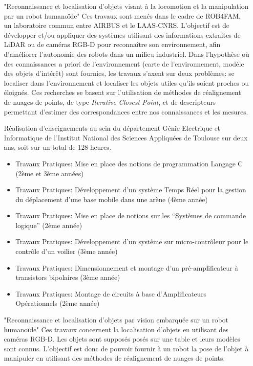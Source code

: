 \documentclass[11pt,a4paper,sans]{moderncv}         %
\begin{document}
{"Reconnaissance et localisation d'objets visant \`a la locomotion et la manipulation par un robot humano\"ide"}
{Ces travaux sont men\'es dans le cadre de ROB4FAM, un laboratoire commun entre AIRBUS et le LAAS-CNRS.
L'objectif est de d\'evelopper et/ou appliquer des syst\`emes utilisant des informations extraites de LiDAR ou de cam\'eras RGB-D pour reconna\^itre son environnement, afin d'am\'eliorer l'autonomie des robots dans un milieu industriel.
Dans l'hypoth\`ese o\`u des connaissances a priori de l'environnement (carte de l'environnement, mod\`ele des objets d'int\'er\^et) sont fournies, les travaux s'axent sur deux probl\`emes: se localiser dans l'environnement et localiser les objets utiles qu'ils soient proches ou \'eloign\'es.
Ces recherches se basent sur l'utilisation de m\'ethodes de r\'ealignement de nuages de points, de type \emph{Iterative Closest Point}, et de descripteurs permettant d'estimer des correspondances entre nos connaissances et les mesures.
}
%
{}{
  R\'ealisation d'enseignements au sein du d\'epartement G\'enie Electrique et Informatique de l'Institut National des Sciences Appliqu\'ees de Toulouse sur deux ans, soit sur un total de 128 heures.
  \begin{itemize}
    \item Travaux Pratiques: Mise en place des notions de programmation Langage C (2\`eme et 3\`eme ann\'ees)
    \item Travaux Pratiques: D\'eveloppement d'un syst\`eme Temps R\'eel pour la gestion du d\'eplacement d'une base mobile dans une ar\`ene (4\`eme ann\'ee)
    \item Travaux Pratiques: Mise en place de notions sur les ``Syst\`emes de commande logique'' (2\`eme ann\'ee)
    \item Travaux Pratiques: D\'eveloppement d'un syst\`eme sur micro-contr\^oleur pour le contr\^ole d'un voilier (3\`eme ann\'ee)
    \item Travaux Pratiques: Dimensionnement et montage d'un pr\'e-amplificateur \`a transistors bipolaires (3\`eme ann\'ee)
    \item Travaux Pratiques: Montage de circuits \`a base d'Amplificateurs Op\'erationnels (2\`eme ann\'ee)
  \end{itemize}
}
%
{"Reconnaissance et localisation d'objets par vision embarqu\'ee sur un robot humano\"ide"}{
  Ces travaux concernent la localisation d'objets en utilisant des cam\'eras RGB-D.
Les objets sont suppos\'es pos\'es sur une table et leurs mod\`eles sont connus.
L'objectif est donc de pouvoir fournir \`a un robot la pose de l'objet \`a manipuler en utilisant des m\'ethodes de r\'ealignement de nuages de points.
}
\end{document}
